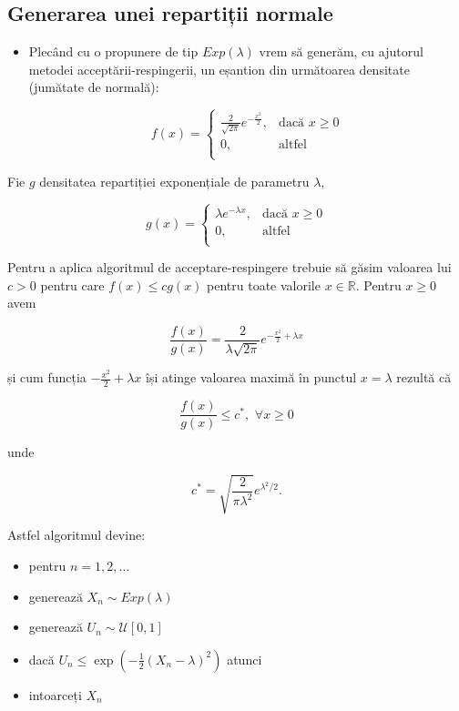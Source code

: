 \documentclass[]{article}
\newenvironment{frshaded*}{%
  \def\FrameCommand{\fboxrule=\FrameRule\fboxsep=\FrameSep \fcolorbox{framecolor}{shadecolor1}}%
  \MakeFramed {\advance\hsize-\width \FrameRestore}}%
{\endMakeFramed}
\newenvironment{rmdblock}[1]
  {\begin{frshaded*}
  \begin{itemize}
  \renewcommand{\labelitemi}{
    \raisebox{-.7\height}[0pt][0pt]{
      {\setkeys{Gin}{width=2em,keepaspectratio}\texttt{[image: images/icons/\#1]}}
    }
  }
  \item
  }
  {
  \end{itemize}
  \end{frshaded*}
  }
\newenvironment{rmdexercise}
  {\begin{rmdblock}{exercise}}
  {\end{rmdblock}}
\begin{document}
\subsection{Generarea unei repartiții
normale}\label{generarea-unei-repartitii-normale}

\begin{rmdexercise}
Plecând cu o propunere de tip \(Exp(\lambda)\) vrem să generăm, cu
ajutorul metodei acceptării-respingerii, un eșantion din următoarea
densitate (jumătate de normală):

\[
  f(x) = \left\{\begin{array}{ll}
    \frac{2}{\sqrt{2\pi}}e^{-\frac{x^2}{2}}, & \mbox{dacă $x\geq0$}\\
    0, & \mbox{altfel}\\           
  \end{array}\right.
\]
\end{rmdexercise}

Fie \(g\) densitatea repartiției exponențiale de parametru \(\lambda\),

\[
    g(x) = \left\{\begin{array}{ll}
        \lambda e^{-\lambda x}, & \mbox{dacă $x\geq0$}\\
        0, & \mbox{altfel}\\           
  \end{array}\right.
\]

Pentru a aplica algoritmul de acceptare-respingere trebuie să găsim
valoarea lui \(c>0\) pentru care \(f(x)\leq c g(x)\) pentru toate
valorile \(x\in \mathbb{R}\). Pentru \(x\geq0\) avem

\[
  \frac{f(x)}{g(x)}=\frac{2}{\lambda\sqrt{2\pi}}e^{-\frac{x^2}{2}+\lambda x}
\]

și cum funcția \(-\frac{x^2}{2}+\lambda x\) își atinge valoarea maximă
în punctul \(x=\lambda\) rezultă că

\[
    \frac{f(x)}{g(x)}\leq c^*, \,\,\forall x \geq0
\]

unde

\[
  c^*=\sqrt{\frac{2}{\pi\lambda^2}}e^{\lambda^2/2}.
\]

Astfel algoritmul devine:

\begin{itemize}
\item
  pentru \(n=1,2,\dots\)
\item
  generează \(X_n\sim Exp(\lambda)\)
\item
  generează \(U_n\sim\mathcal{U}[0,1]\)
\item
  dacă \(U_n\leq\exp\left(-\frac{1}{2}(X_n-\lambda)^2\right)\) atunci
\item
  intoarceți \(X_n\)
\end{itemize}
\end{document}
